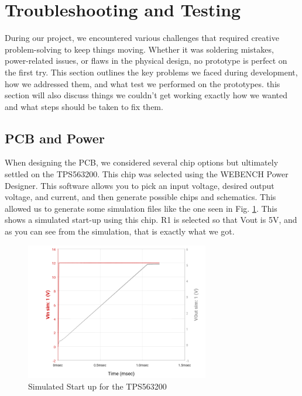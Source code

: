 \section{Troubleshooting and Testing}
During our project, we encountered various challenges that required creative problem-solving to keep things moving. Whether it was soldering mistakes, power-related issues, or flaws in the physical design, no prototype is perfect on the first try. This section outlines the key problems we faced during development, how we addressed them, and what test we performed on the prototypes. this section will also discuss things we couldn't get working exactly how we wanted and what steps should be taken to fix them.
\subsection{PCB and Power}
When designing the PCB, we considered several chip options but ultimately settled on the TPS563200. This chip was selected using the WEBENCH Power Designer. This software allows you to pick an input voltage, desired output voltage, and current, and then generate possible chips and schematics. This allowed us to generate some simulation files like the one seen in Fig. \ref{fig:Vout}. This shows a simulated start-up using this chip. R1 is selected so that Vout is 5V, and as you can see from the simulation, that is exactly what we got.
\begin{figure}[H]
    \centering
    \includegraphics[height=6cm]{Vout_chart.png}
     \caption{Simulated Start up for the TPS563200}
    \label{fig:Vout}
\end{figure}
